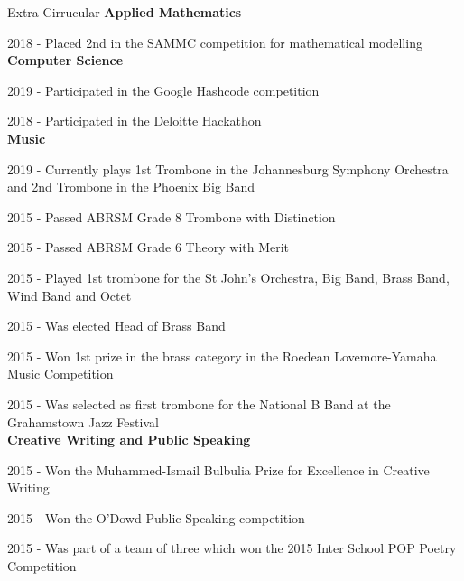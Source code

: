 \documentclass{resume} %
\begin{document}
\begin{rSection}{Extra-Cirrucular} \itemsep -3pt
{\bf Applied Mathematics}
\item 2018 - Placed 2nd in the SAMMC competition for mathematical modelling
\\{\bf Computer Science}
\item 2019 - Participated in the Google Hashcode competition
\item 2018 - Participated in the Deloitte Hackathon
\\{\bf Music}
\item 2019 - Currently plays 1st Trombone in the Johannesburg Symphony Orchestra and 2nd Trombone in the Phoenix Big Band
\item 2015 - Passed ABRSM Grade 8 Trombone with Distinction
\item 2015 - Passed ABRSM Grade 6 Theory with Merit
\item 2015 - Played 1st trombone for the St John’s Orchestra, Big Band, Brass Band, Wind Band and Octet
\item 2015 - Was elected Head of Brass Band
\item 2015 - Won 1st  prize in the brass category in the Roedean Lovemore-Yamaha Music Competition
\item 2015 - Was selected as first trombone for the National B Band at the Grahamstown Jazz Festival
\\{\bf Creative Writing and Public Speaking}
\item 2015 - Won the Muhammed-Ismail Bulbulia Prize for Excellence in Creative Writing
\item 2015 - Won the O’Dowd Public Speaking competition
\item 2015 - Was part of a team of three which won the 2015 Inter School POP Poetry Competition 
\end{rSection}
\end{document}
